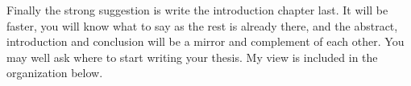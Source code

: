 Finally the strong suggestion is write the introduction chapter last. It will be faster, you will know what to say as the rest is already there, and the abstract, introduction and conclusion will be a mirror and complement of each other. You may well ask where to start writing your thesis. My view is included in the organization below.
